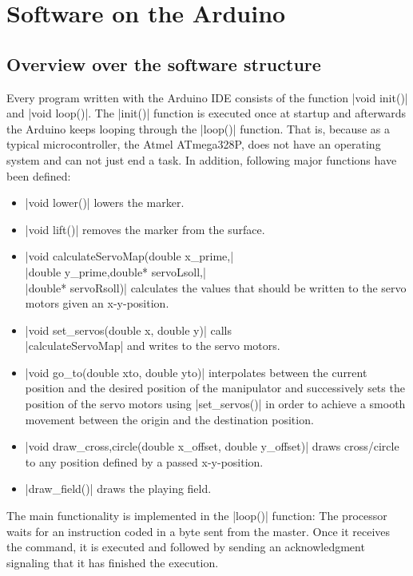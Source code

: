 \documentclass{sig-alternate-05-2015}
\begin{document}
\section{Software on the Arduino}
\subsection{Overview over the software structure}
Every program written with the Arduino IDE consists of the function |void init()| and |void loop()|. The |init()| function is executed once at startup and afterwards the Arduino keeps looping through the |loop()| function. That is, because as a typical microcontroller, the Atmel ATmega328P, does not have an operating system and can not just end a task. In addition, following major functions have been defined:

\begin{itemize}
	\item |void lower()| lowers the marker.
	\item |void lift()| removes the marker from the surface.
	\item |void calculateServoMap(double x_prime,|\\|double y_prime,double* servoLsoll,|\\|double* servoRsoll)|
	 calculates the values that should be written to the servo motors given an x-y-position.
	\item |void set_servos(double x, double y)| calls\\ |calculateServoMap| and writes to the servo motors.
	\item  |void go_to(double xto, double yto)| interpolates between the current position and the desired position of the manipulator and successively sets the position of the servo motors using |set_servos()| in order to achieve a smooth movement between the origin and the destination position.
	\item |void draw_{cross,circle}(double x_offset, double y_offset)| draws cross/circle to any position defined by a passed x-y-position.
	\item |draw_field()| draws the playing field.
\end{itemize}

The main functionality is implemented in the |loop()| function: The processor waits for an instruction coded in a byte sent from the master. Once it receives the command, it is executed and followed by sending an acknowledgment signaling that it has finished the execution.
\end{document}
